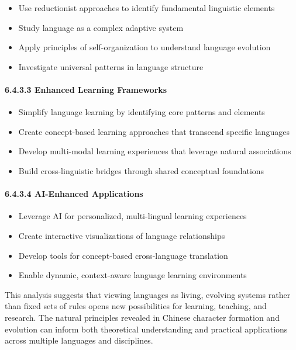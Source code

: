 \documentclass[11pt,letterpaper]{article}
\begin{document}
\begin{itemize}
\tightlist
\item
  Use reductionist approaches to identify fundamental linguistic
  elements
\item
  Study language as a complex adaptive system
\item
  Apply principles of self-organization to understand language evolution
\item
  Investigate universal patterns in language structure
\end{itemize}

\paragraph{6.4.3.3 Enhanced Learning
Frameworks}\label{enhanced-learning-frameworks}

\begin{itemize}
\tightlist
\item
  Simplify language learning by identifying core patterns and elements
\item
  Create concept-based learning approaches that transcend specific
  languages
\item
  Develop multi-modal learning experiences that leverage natural
  associations
\item
  Build cross-linguistic bridges through shared conceptual foundations
\end{itemize}

\paragraph{6.4.3.4 AI-Enhanced
Applications}\label{ai-enhanced-applications}

\begin{itemize}
\tightlist
\item
  Leverage AI for personalized, multi-lingual learning experiences
\item
  Create interactive visualizations of language relationships
\item
  Develop tools for concept-based cross-language translation
\item
  Enable dynamic, context-aware language learning environments
\end{itemize}

This analysis suggests that viewing languages as living, evolving
systems rather than fixed sets of rules opens new possibilities for
learning, teaching, and research. The natural principles revealed in
Chinese character formation and evolution can inform both theoretical
understanding and practical applications across multiple languages and
disciplines.
\end{document}
